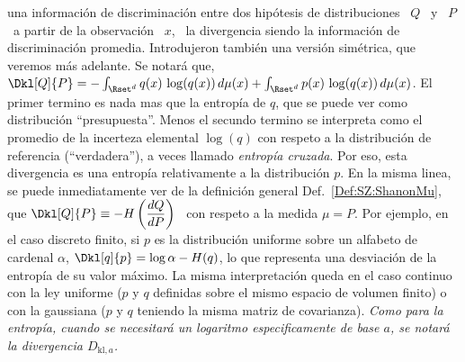 una informaci\'on de discriminaci\'on  entre dos hip\'otesis de distribuciones \
$Q$ \ y \  $P$ \ a partir de la observaci\'on \ $x$,  \ la divergencia siendo la
informaci\'on   de  discriminaci\'on   promedia.   Introdujeron   tambi\'en  una
versi\'on sim\'etrica, que veremos m\'as adelante.  Se notar\'a que, $\Dkl[Q]{P}
=  - \int_{\Rset^d}  q(x)  \, \log(q(x))  \,  d\mu(x) +  \int_{\Rset^d} p(x)  \,
\log(q(x)) \, d\mu(x)$.  El primer termino es nada mas que la entrop\'ia de $q$,
que se puede  ver como distribuci\'on ``presupuesta''. Menos  el secundo termino
se interpreta como el promedio de la incerteza elemental $\log(q)$ con respeto a
la distribuci\'on de referencia (``verdadera''), a veces llamado {\it entrop\'ia
  cruzada}.   Por eso,  esta divergencia  es una  entrop\'ia relativamente  a la
distribuci\'on  $p$.  En  la  misma linea,  se  puede inmediatamente  ver de  la
definici\'on general Def.~\ref{Def:SZ:ShanonMu},
que  $\displaystyle  \Dkl[Q]{P} \equiv  -H\left(  \frac{dQ}{dP}  \right)$ \  con
respeto a la medida $\mu = P$.   Por ejemplo, en el caso discreto finito, si $p$
es  la   distribuci\'on  uniforme  sobre  un  alfabeto   de  cardenal  $\alpha$,
$\Dkl[q]{p} =  \log \alpha  - H(q)$,  lo que representa  una desviaci\'on  de la
entrop\'ia de  su valor  m\'aximo.  La misma  interpretaci\'on queda en  el caso
continuo con  la ley  uniforme ($p$ y  $q$ definidas  sobre el mismo  espacio de
volumen  finito) o  con la  gaussiana ($p$  y $q$  teniendo la  misma  matriz de
covarianza).  {\it Como para la  entrop\'ia, cuando se necesitar\'a un logaritmo
  especificamente de base $a$, se notar\'a la divergencia $D_{\mathrm{kl},a}$.}

